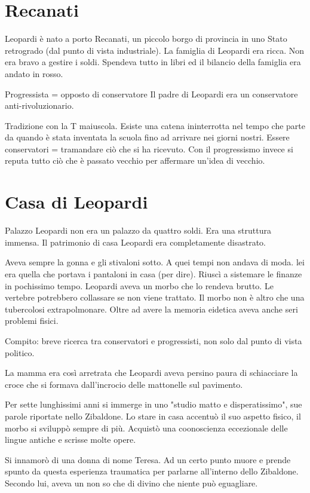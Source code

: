 \documentclass{article}
\begin{document}
    \section{Recanati}
    Leopardi è nato a porto Recanati, un piccolo borgo di provincia in uno Stato retrogrado (dal punto di vista industriale). La famiglia di Leopardi era ricca. Non era bravo a gestire i soldi. Spendeva tutto in libri ed il bilancio della famiglia era andato in rosso.

    Progressista = opposto di conservatore
    Il padre di Leopardi era un conservatore anti-rivoluzionario.

    Tradizione con la T maiuscola. Esiste una catena ininterrotta nel tempo che parte da quando è stata inventata la scuola fino ad arrivare nei giorni nostri. Essere conservatori = tramandare ciò che si ha ricevuto.
    Con il progressismo invece si reputa tutto ciò che è passato vecchio per affermare un'idea di vecchio.

    \section{Casa di Leopardi}
    Palazzo Leopardi non era un palazzo da quattro soldi. Era una struttura immensa.
    Il patrimonio di casa Leopardi era completamente disastrato.

    Aveva sempre la gonna e gli stivaloni sotto. A quei tempi non andava di moda.
    lei era quella che portava i pantaloni in casa (per dire). Riuscì a sistemare le finanze in pochissimo tempo.
    Leopardi aveva un morbo che lo rendeva brutto. Le vertebre potrebbero collassare se non viene trattato. Il morbo non è altro che una tubercolosi extrapolmonare. Oltre ad avere la memoria eidetica aveva anche seri problemi fisici.

    Compito: breve ricerca tra conservatori e progressisti, non solo dal punto di vista politico.
    
    La mamma era così arretrata che Leopardi aveva persino paura di schiacciare la croce che si formava dall'incrocio delle mattonelle sul pavimento.

    Per sette lunghissimi anni si immerge in uno "studio matto e disperatissimo", sue parole riportate nello Zibaldone. Lo stare in casa accentuò il suo aspetto fisico, il morbo si sviluppò sempre di più. Acquistò una coonoscienza eccezionale delle lingue antiche e scrisse molte opere.

    Si innamorò di una donna di nome Teresa. Ad un certo punto muore e prende spunto da questa esperienza traumatica per parlarne all'interno dello Zibaldone. Secondo lui, aveva un non so che di divino che niente può eguagliare.
\end{document}
